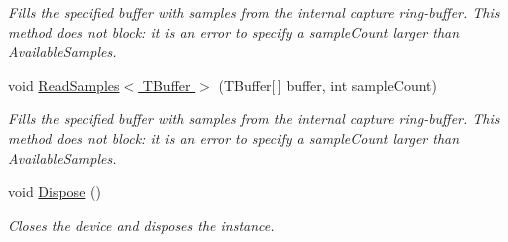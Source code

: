\begin{DoxyCompactItemize}
\begin{DoxyCompactList}\small\item\em Fills the specified buffer with samples from the internal capture ring-\/buffer. This method does not block\-: it is an error to specify a sample\-Count larger than Available\-Samples.\end{DoxyCompactList}\item 
void \hyperlink{class_open_t_k_1_1_audio_1_1_audio_capture_ae219ea5d980e0cb9713c22336bd1083f}{Read\-Samples$<$ T\-Buffer $>$} (T\-Buffer\mbox{[}$\,$\mbox{]} buffer, int sample\-Count)
\begin{DoxyCompactList}\small\item\em Fills the specified buffer with samples from the internal capture ring-\/buffer. This method does not block\-: it is an error to specify a sample\-Count larger than Available\-Samples.\end{DoxyCompactList}\item 
void \hyperlink{class_open_t_k_1_1_audio_1_1_audio_capture_a019cd03b08a0195262a83647c9228baf}{Dispose} ()
\begin{DoxyCompactList}\small\item\em Closes the device and disposes the instance.\end{DoxyCompactList}\end{DoxyCompactItemize}
